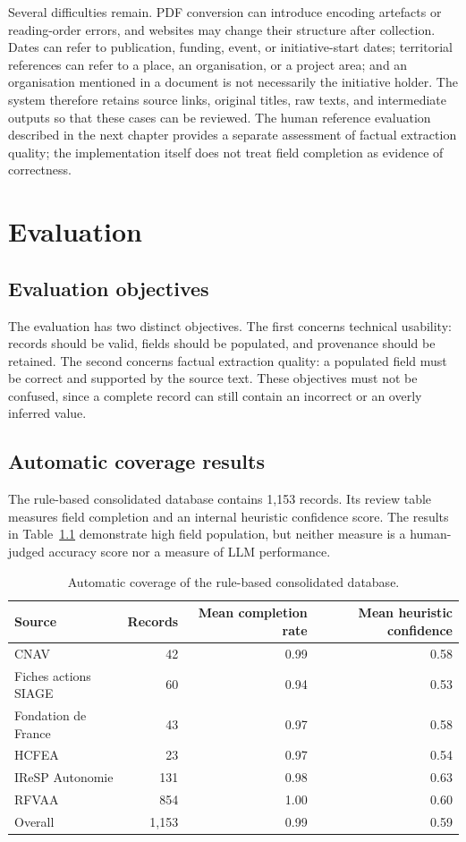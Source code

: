 \documentclass[
11pt,
english,
singlespacing,
headsepline,
]{MastersDoctoralThesis}
\begin{document}
Several difficulties remain. PDF conversion can introduce encoding artefacts or
reading-order errors, and websites may change their structure after collection.
Dates can refer to publication, funding, event, or initiative-start dates;
territorial references can refer to a place, an organisation, or a project
area; and an organisation mentioned in a document is not necessarily the
initiative holder. The system therefore retains source links, original titles,
raw texts, and intermediate outputs so that these cases can be reviewed. The
human reference evaluation described in the next chapter provides a separate
assessment of factual extraction quality; the implementation itself does not
treat field completion as evidence of correctness.

\chapter{Evaluation}

\section{Evaluation objectives}

The evaluation has two distinct objectives. The first concerns technical
usability: records should be valid, fields should be populated, and provenance
should be retained. The second concerns factual extraction quality: a populated
field must be correct and supported by the source text. These objectives must
not be confused, since a complete record can still contain an incorrect or an
overly inferred value.

\section{Automatic coverage results}

The rule-based consolidated database contains 1,153 records. Its review table
measures field completion and an internal heuristic confidence score. The
results in Table~\ref{tab:coverage-results} demonstrate high field population,
but neither measure is a human-judged accuracy score nor a measure of LLM
performance.

\begin{table}[H]
\centering
\begin{tabular}{lrrr}
\toprule
Source & Records & Mean completion rate & Mean heuristic confidence \\
\midrule
CNAV & 42 & 0.99 & 0.58 \\
Fiches actions SIAGE & 60 & 0.94 & 0.53 \\
Fondation de France & 43 & 0.97 & 0.58 \\
HCFEA & 23 & 0.97 & 0.54 \\
IReSP Autonomie & 131 & 0.98 & 0.63 \\
RFVAA & 854 & 1.00 & 0.60 \\
\midrule
Overall & 1,153 & 0.99 & 0.59 \\
\bottomrule
\end{tabular}
\caption{Automatic coverage of the rule-based consolidated database.}
\label{tab:coverage-results}
\end{table}
\end{document}
